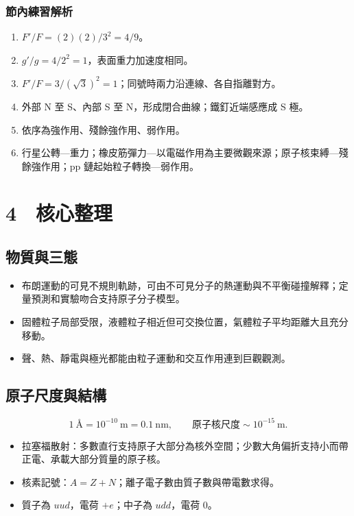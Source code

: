 \documentclass[11pt,a4paper]{article}
\providecommand{\tightlist}{%
  \setlength{\itemsep}{0pt}\setlength{\parskip}{0pt}}
\begin{document}
\subsubsection{節內練習解析}\label{ux7bc0ux5167ux7df4ux7fd2ux89e3ux6790-2}

\begin{enumerate}
\def\labelenumi{\arabic{enumi}.}
\tightlist
\item
  \(F'/F=(2)(2)/3^2=4/9\)。
\item
  \(g'/g=4/2^2=1\)，表面重力加速度相同。
\item
  \(F'/F=3/(\sqrt3)^2=1\)；同號時兩力沿連線、各自指離對方。
\item
  外部 N 至 S、內部 S 至 N，形成閉合曲線；鐵釘近端感應成 S 極。
\item
  依序為強作用、殘餘強作用、弱作用。
\item
  行星公轉---重力；橡皮筋彈力---以電磁作用為主要微觀來源；原子核束縛---殘餘強作用；pp 鏈起始粒子轉換---弱作用。
\end{enumerate}

\section{4　核心整理}\label{ux6838ux5fc3ux6574ux7406}

\subsection{物質與三態}\label{ux7269ux8ceaux8207ux4e09ux614b}

\begin{itemize}
\tightlist
\item
  布朗運動的可見不規則軌跡，可由不可見分子的熱運動與不平衡碰撞解釋；定量預測和實驗吻合支持原子分子模型。
\item
  固體粒子局部受限，液體粒子相近但可交換位置，氣體粒子平均距離大且充分移動。
\item
  聲、熱、靜電與極光都能由粒子運動和交互作用連到巨觀觀測。
\end{itemize}

\subsection{原子尺度與結構}\label{ux539fux5b50ux5c3aux5ea6ux8207ux7d50ux69cb}

\[
1\ \text{Å}=10^{-10}\ \mathrm m=0.1\ \mathrm{nm},
\qquad
\text{原子核尺度}\sim10^{-15}\ \mathrm m.
\]

\begin{itemize}
\tightlist
\item
  拉塞福散射：多數直行支持原子大部分為核外空間；少數大角偏折支持小而帶正電、承載大部分質量的原子核。
\item
  核素記號：\(A=Z+N\)；離子電子數由質子數與帶電數求得。
\item
  質子為 \(uud\)，電荷 \(+e\)；中子為 \(udd\)，電荷 0。
\end{itemize}
\end{document}
